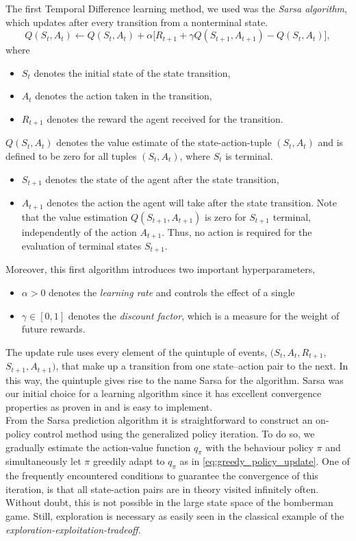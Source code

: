 The first Temporal Difference learning method, we used was the \emph{Sarsa algorithm}, which updates after every transition from a nonterminal state.  \\
\begin{equation} \label{eq:sarsa_update}
	Q(S_t, A_t) \leftarrow Q(S_t, A_t) + \alpha \big[R_{t+1} + \gamma Q(S_{t+1}, A_{t+1}) - Q(S_t, A_t)\big],
\end{equation}
where
\begin{itemize}
	\item $S_t$ denotes the initial state of the state transition,
	\item $A_t$ denotes the action taken in the transition,
	\item $R_{t+1}$ denotes the reward the agent received for the transition.
\end{itemize}
$Q(S_t, A_t)$ denotes the value estimate of the state-action-tuple $(S_t, A_t)$ and is defined to be zero for all tuples $(S_t, A_t)$, where $S_t$ is terminal.
\begin{itemize}
	\item $S_{t+1}$ denotes the state of the agent after the state transition,
	\item $A_{t+1}$ denotes the action the agent will take after the state transition. Note that the value estimation $Q(S_{t+1}, A_{t+1})$ is zero for $S_{t+1}$ terminal, independently of the action $A_{t+1}$. Thus, no action is required for the evaluation of terminal states $S_{t+1}$. 
\end{itemize}
Moreover, this first algorithm introduces two important hyperparameters,
\begin{itemize}
	\item $\alpha > 0$ denotes the \emph{learning rate} and controls the effect of a single 
	\item $\gamma \in [0, 1]$ denotes the \emph{discount factor}, which is a measure for the weight of future rewards. 
\end{itemize}

The update rule uses every element of the quintuple of events, $(S_t, A_t, R_{t+1}$, $S_{t+1}, A_{t+1})$, that make up a transition from one state–action pair to the next. In this way, the quintuple gives rise to the name Sarsa for the algorithm. Sarsa was our initial choice for a learning algorithm since it has excellent convergence properties as proven in \cite{Singh2000} and is easy to implement. \\

From the Sarsa prediction algorithm it is straightforward to construct an on-policy control method using the generalized policy iteration. To do so, we gradually estimate the action-value function $q_\pi$ with the behaviour policy $\pi$ and simultaneously let $\pi$ greedily adapt to $q_\pi$ as in \eqref{eq:greedy_policy_update}. One of the frequently encountered conditions to guarantee the convergence of this iteration, is that all state-action pairs are in theory visited infinitely often. Without doubt, this is not possible in the large state space of the bomberman game. Still, exploration is necessary as easily seen in the classical example of the \emph{exploration-exploitation-tradeoff}. 

